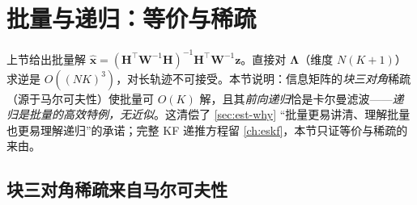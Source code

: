 \section{批量与递归：等价与稀疏}
\label{sec:est-batch-recursive}

上节给出批量解 $\hat{\mathbf{x}}=(\mathbf{H}^\top\mathbf{W}^{-1}\mathbf{H})^{-1}\mathbf{H}^\top\mathbf{W}^{-1}\mathbf{z}$。直接对 $\boldsymbol{\Lambda}$（维度 $N(K+1)$）求逆是 $O((NK)^3)$，对长轨迹不可接受。本节说明：信息矩阵的\emph{块三对角}稀疏（源于马尔可夫性）使批量可 $O(K)$ 解，且其\emph{前向递归}恰是卡尔曼滤波——\emph{递归是批量的高效特例，无近似}。这清偿了 \cref{sec:est-why} “批量更易讲清、理解批量也更易理解递归”的承诺；完整 KF 递推方程留 \cref{ch:eskf}，本节只证等价与稀疏的来由。

\subsection{块三对角稀疏来自马尔可夫性}
\label{sec:est-sparsity}

